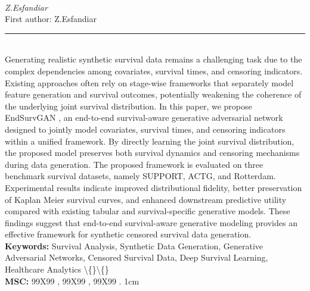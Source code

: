 \documentclass[10pt,twoside]{article}
\begin{document}
\noindent\begin{minipage}[t][\textheight]{\textwidth}
\\[0.35em]
{\itshape Z.Esfandiar}\\[0.2em]
{\footnotesize First author: Z.Esfandiar}\\[0.45em]
\noindent\rule{\textwidth}{0.3pt}\\[0.4em]
{\footnotesize Generating realistic synthetic survival data remains a challenging task due to the complex dependencies among covariates, survival times, and censoring indicators. Existing approaches often rely on stage-wise frameworks that separately model feature generation and survival outcomes, potentially weakening the coherence of the underlying joint survival distribution. In this paper, we propose EndSurvGAN , an end-to-end survival-aware generative adversarial network designed to jointly model covariates, survival times, and censoring indicators within a unified framework. By directly learning the joint survival distribution, the proposed model preserves both survival dynamics and censoring mechanisms during data generation. The proposed framework is evaluated on three benchmark survival datasets, namely SUPPORT, ACTG, and Rotterdam. Experimental results indicate improved distributional fidelity, better preservation of Kaplan Meier survival curves, and enhanced downstream predictive utility compared with existing tabular and survival-specific generative models. These findings suggest that end-to-end survival-aware generative modeling provides an effective framework for synthetic censored survival data generation.}\\[0.4em]
{\footnotesize\bfseries Keywords:} {\footnotesize Survival Analysis, Synthetic Data Generation, Generative Adversarial Networks, Censored Survival Data, Deep Survival Learning, Healthcare Analytics \textbackslash\{\}\textbackslash\{\}}\\[0.15em]
{\footnotesize\bfseries MSC:} {\footnotesize 99X99 , 99X99 , 99X99 . 1cm}\\
\vfill
\end{minipage}
\newpage
\end{document}
